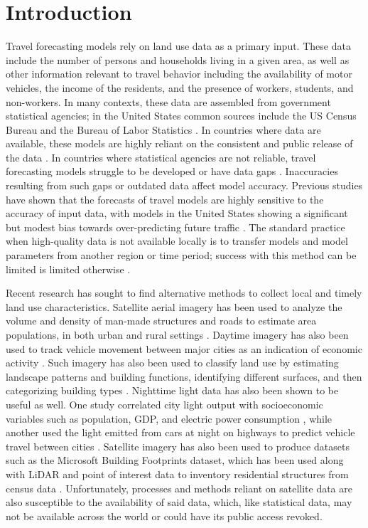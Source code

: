 \documentclass[conference,]{IEEEtran}
\begin{document}
\section{Introduction}\label{introduction}

Travel forecasting models rely on land use data as a primary input.
These data include the number of persons and households living in a
given area, as well as other information relevant to travel behavior
including the availability of motor vehicles, the income of the
residents, and the presence of workers, students, and non-workers. In
many contexts, these data are assembled from government statistical
agencies; in the United States common sources include the US Census
Bureau and the Bureau of Labor Statistics \autocite{nchrp}. In countries
where data are available, these models are highly reliant on the
consistent and public release of the data
\autocite{rohanna_census_2006}. In countries where statistical agencies
are not reliable, travel forecasting models struggle to be developed or
have data gaps \autocite{abueisheh_trip_2024}. Inaccuracies resulting
from such gaps or outdated data affect model accuracy. Previous studies
have shown that the forecasts of travel models are highly sensitive to
the accuracy of input data, with models in the United States showing a
significant but modest bias towards over-predicting future traffic
\autocite{erhardt2020traffic}. The standard practice when high-quality
data is not available locally is to transfer models and model parameters
from another region or time period; success with this method can be
limited is limited otherwise
\autocite{wilmot2001transferability,bowman2017testing}.

Recent research has sought to find alternative methods to collect local
and timely land use characteristics. Satellite aerial imagery has been
used to analyze the volume and density of man-made structures and roads
to estimate area populations, in both urban and rural settings
\autocite{allaw_population_2020,fibaek_multi-sensor_2021}. Daytime
imagery has also been used to track vehicle movement between major
cities as an indication of economic activity
\autocite{lehnert_proxying_2023}. Such imagery has also been used to
classify land use by estimating landscape patterns and building
functions, identifying different surfaces, and then categorizing
building types \autocite{zhang_landscape_2020}. Nighttime light data has
also been shown to be useful as well. One study correlated city light
output with socioeconomic variables such as population, GDP, and
electric power consumption \autocite{kamarajugedda_assessing_2017},
while another used the light emitted from cars at night on highways to
predict vehicle travel between cities \autocite{chang_novel_2020}.
Satellite imagery has also been used to produce datasets such as the
Microsoft Building Footprints dataset, which has been used along with
LiDAR and point of interest data to inventory residential structures
from census data
\autocite{microsoft_globalmlbuildingfootprints_2026,ye_enhancing_2024}.
Unfortunately, processes and methods reliant on satellite data are also
susceptible to the availability of said data, which, like statistical
data, may not be available across the world or could have its public
access revoked.
\end{document}
